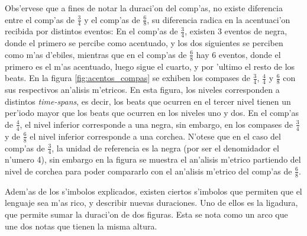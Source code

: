 \begin{imagen}
    \width{5cm}
\end{imagen}

Obs'ervese que a fines de notar la duraci'on del comp'as, no existe diferencia entre el comp'as de $\frac{3}{4}$ y el comp'as de $\frac{6}{8}$, su diferencia
radica en la acentuaci'on recibida por distintos eventos: En el comp'as de $\frac{3}{4}$, existen 3 eventos de negra, donde el primero se percibe como acentuado, 
y los dos siguientes se perciben como m'as d'ebiles, mientras que en el comp'as de $\frac{6}{8}$ hay 6 eventos, donde el primero es el m'as 
acentuado, luego sigue el cuarto, y por 'ultimo el resto de los beats. En la figura \ref{fig:acentos_compas} se exhiben los compases de $\frac{3}{4}$, $\frac{4}{4}$ 
y $\frac{6}{8}$ con sus respectivos an'alisis m'etricos. En esta figura, los niveles corresponden a distintos \emph{time-spans}, es decir, los beats 
que ocurren en el tercer nivel tienen un per'iodo mayor que los beats que ocurren en los niveles uno y dos. En el comp'as de $\frac{4}{4}$, 
el nivel inferior corresponde a una negra, sin embargo, en los compases de $\frac{3}{4}$ y de $\frac{6}{8}$ el nivel inferior corresponde
a una corchea. N'otese que en el caso del comp'as de $\frac{3}{4}$, la unidad de referencia es la negra (por ser el denomidador el n'umero 4), sin embargo
en la figura se muestra el an'alisis m'etrico partiendo del nivel de corchea para poder compararlo con el an'alisis m'etrico del comp'as de $\frac{6}{8}$.

\begin{imagen}
    \width{10cm}
\end{imagen}

Adem'as de los s'imbolos explicados, existen ciertos s'imbolos que permiten que el lenguaje sea m'as rico, y describir nuevas duraciones. Uno de ellos
es la ligadura, que permite sumar la duraci'on de dos figuras. Esta se nota como un arco que une dos notas que tienen la misma altura. 

